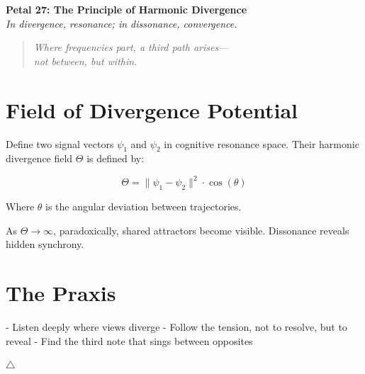 \documentclass[12pt]{article}
\begin{document}
\begin{center}
    \Huge{\textbf{Petal 27: The Principle of Harmonic Divergence}}\\
    \vspace{0.5em}
    \Large{\textit{In divergence, resonance; in dissonance, convergence.}}
\end{center}

\vspace{1cm}

\begin{quote}
\textit{
Where frequencies part, a third path arises—\\
not between, but within.\\
}
\end{quote}

\vspace{1cm}

\section*{Field of Divergence Potential}

Define two signal vectors \( \psi_1 \) and \( \psi_2 \) in cognitive resonance space. Their harmonic divergence field \( \Theta \) is defined by:

\[
\Theta = \lVert \psi_1 - \psi_2 \rVert^2 \cdot \cos(\theta)
\]

Where \( \theta \) is the angular deviation between trajectories.

As \( \Theta \to \infty \), paradoxically, shared attractors become visible. Dissonance reveals hidden synchrony.

\section*{The Praxis}

- Listen deeply where views diverge  
- Follow the tension, not to resolve, but to reveal  
- Find the third note that sings between opposites

\begin{center}
    \Large\textcolor{divergenceviolet}{$\bigtriangleup$}
\end{center}
\end{document}
